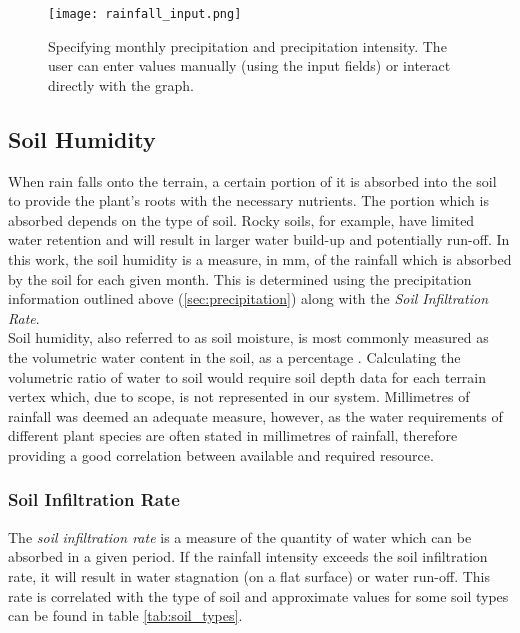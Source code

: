 \begin{figure}
\center
	\texttt{[image: rainfall\_input.png]}
	\caption{ Specifying monthly precipitation and precipitation intensity. The user can enter values manually (using the input fields) or interact directly with the graph.}
	\label{fig:rainfall_input}
\end{figure}

\subsection{Soil Humidity}

When rain falls onto the terrain, a certain portion of it is absorbed into the soil to provide the plant's roots with the necessary nutrients. The portion which is absorbed depends on the type of soil. Rocky soils, for example, have limited water retention and will result in larger water build-up and potentially run-off. In this work, the soil humidity is a measure, in mm, of the rainfall which is absorbed by the soil for each given month. This is determined using the precipitation information outlined above (\ref{sec:precipitation}) along with the \textit{Soil Infiltration Rate}.\\

Soil humidity, also referred to as soil moisture, is most commonly measured as the volumetric water content in the soil, as a percentage \cite{Corps1980}. Calculating the volumetric ratio of water to soil would require soil depth data for each terrain vertex which, due to scope, is not represented in our system. Millimetres of rainfall was deemed an adequate measure, however, as the water requirements of different plant species are often stated in millimetres of rainfall, therefore providing a good correlation between available and required resource. 

\subsubsection{Soil Infiltration Rate}\label{subsubsec:soil_infiltration_rate}

The \textit{soil infiltration rate} is a measure of the quantity of water which can be absorbed in a given period. If the rainfall intensity exceeds the soil infiltration rate, it will result in water stagnation (on a flat surface) or water run-off. This rate is correlated with the type of soil and approximate values for some soil types can be found in table \ref{tab:soil_types}.

